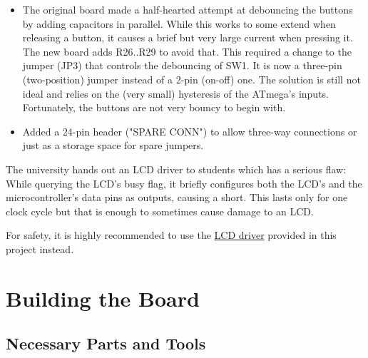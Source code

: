 \documentclass{article}
\newenvironment{caution}{\begin{tcolorbox}[colback=red!5!white,colframe=red!75!black,title=\textbf{Caution}]}{\end{tcolorbox}}
\begin{document}
\begin{itemize}
\item The original board made a half-hearted attempt at debouncing the buttons by adding capacitors in parallel. While this works to some extend when releasing a button, it causes a brief but very large current when pressing it. The new board adds R26..R29 to avoid that. This required a change to the jumper (JP3) that controls the debouncing of SW1. It is now a three-pin (two-position) jumper instead of a 2-pin (on-off) one. The solution is still not ideal and relies on the (very small) hysteresis of the ATmega's inputs. Fortunately, the buttons are not very bouncy to begin with. 
\item Added a 24-pin header ("SPARE CONN") to allow three-way connections or just as a storage space for spare jumpers. 
\end{itemize}

\begin{caution}
The university hands out an LCD driver to students which has a serious flaw: While querying the LCD's busy flag, it briefly configures both the LCD's and the microcontroller's data pins as outputs, causing a short. This lasts only for one clock cycle but that is enough to sometimes cause damage to an LCD. 

For safety, it is highly recommended to use the \href{../Drivers/LCD/}{LCD driver} provided in this project instead.
\end{caution}

\section{Building the Board}
\subsection{Necessary Parts and Tools}
\end{document}
